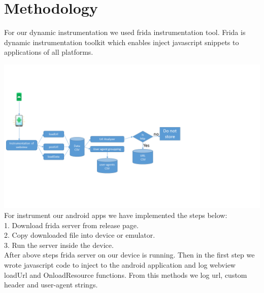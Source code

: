 \section{Methodology}
For our dynamic instrumentation we used frida instrumentation tool\cite{frida}. Frida is dynamic instrumentation toolkit which enables inject javascript snippets to applications of all platforms.


\includegraphics[width=\textwidth]{images/Proccess.PNG}
For instrument our android apps we have implemented the steps below:\\
1. Download frida server from release page.\\
2. Copy downloaded file into device or emulator.\\ 
3. Run the server inside the device.\\
After above steps frida server on our device is running. Then in the first step we wrote javascript code to inject to the android application and log webview loadUrl and OnloadResource functions. From this methods we log url, custom header and user-agent strings.\\
